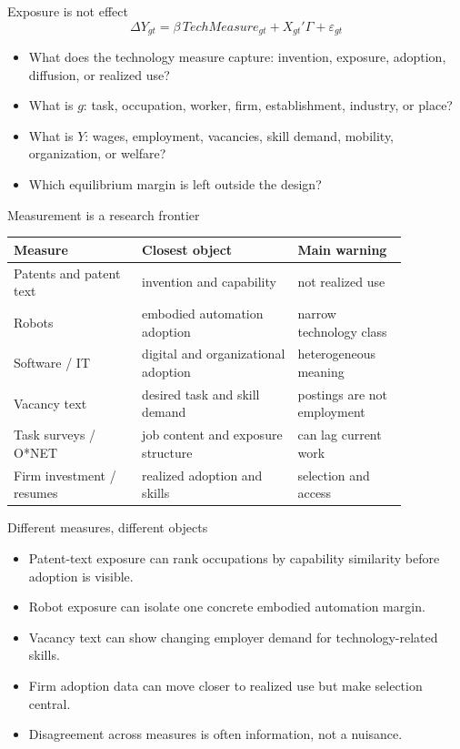 \documentclass[aspectratio=169,11pt]{beamer}
\begin{document}
\begin{frame}{Exposure is not effect}
\[
\Delta Y_{g t} =
\beta \, TechMeasure_{g t}
+ X_{g t}'\Gamma
+ \varepsilon_{g t}
\]
\begin{itemize}
    \item What does the technology measure capture: invention, exposure, adoption, diffusion, or realized use?
    \item What is $g$: task, occupation, worker, firm, establishment, industry, or place?
    \item What is $Y$: wages, employment, vacancies, skill demand, mobility, organization, or welfare?
    \item Which equilibrium margin is left outside the design?
\end{itemize}
\end{frame}

\begin{frame}{Measurement is a research frontier}
\small
\begin{tabular}{p{0.28\linewidth} p{0.34\linewidth} p{0.24\linewidth}}
\toprule
Measure & Closest object & Main warning \\
\midrule
Patents and patent text & invention and capability & not realized use \\
Robots & embodied automation adoption & narrow technology class \\
Software / IT & digital and organizational adoption & heterogeneous meaning \\
Vacancy text & desired task and skill demand & postings are not employment \\
Task surveys / O*NET & job content and exposure structure & can lag current work \\
Firm investment / resumes & realized adoption and skills & selection and access \\
\bottomrule
\end{tabular}
\end{frame}

\begin{frame}{Different measures, different objects}
\begin{itemize}
    \item Patent-text exposure can rank occupations by capability similarity before adoption is visible.
    \item Robot exposure can isolate one concrete embodied automation margin.
    \item Vacancy text can show changing employer demand for technology-related skills.
    \item Firm adoption data can move closer to realized use but make selection central.
    \item Disagreement across measures is often information, not a nuisance.
\end{itemize}
\end{frame}
\end{document}
